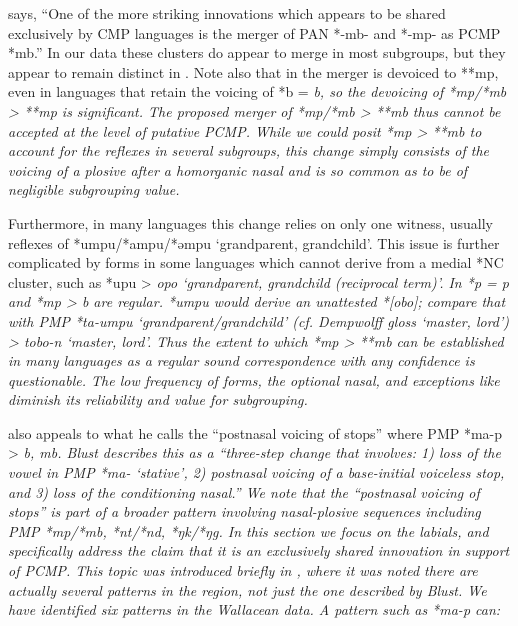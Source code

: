 \citet[26]{Blust1981} says,
“One of the more striking innovations which appears to be shared
exclusively by CMP languages is the merger of PAN *-mb-
and *-mp- as PCMP *mb.” In our data these clusters do appear
to merge in most subgroups,
but they appear to remain distinct in .
Note also that in  the merger is devoiced to
**mp, even in languages that retain the voicing of *b = \it{b},
so the devoicing of *mp/*mb > **mp is significant.
The proposed merger of *mp/*mb > **mb thus cannot be accepted
at the level of putative PCMP.
While we could posit *mp > **mb to account for the reflexes in
several subgroups, this change simply consists of the voicing of a plosive after
a homorganic nasal and is so common as to be of negligible subgrouping value.

Furthermore, in many languages this change relies on only one
witness, usually reflexes of *umpu/*ampu/*əmpu ‘grandparent, grandchild’.
This issue is further complicated by forms in some languages
which cannot derive from a medial *NC cluster,
such as *upu >  \it{opo} ‘grandparent, grandchild (reciprocal term)’.
In  *p = \it{p}
and *mp > \it{b} are regular.
*umpu would derive an unattested *[obo]; compare that with PMP *ta-umpu ‘grandparent/grandchild’ (cf.
Dempwolff gloss ‘master, lord’) >  \it{tobo-n} ‘master, lord’.
Thus the extent to which *mp > **mb can be established in many
languages as a regular sound correspondence with any confidence is questionable.
The low frequency of forms,
the optional nasal, and exceptions like  diminish its reliability
and value for subgrouping.

\citet[72]{Blust2009} also appeals to what he calls the “postnasal
voicing of stops” where PMP *ma-p > \it{b, mb}.
Blust describes this as a “three-step change that involves: 1)
loss of the vowel in PMP *ma- ‘stative’,
2) postnasal voicing of a base-initial voiceless stop,
and 3) loss of the conditioning nasal.” We note that the “postnasal
voicing of stops” is part of a broader pattern involving nasal-plosive
sequences including PMP *mp/*mb, *nt/*nd, *ŋk/*ŋg.
In this section we focus on the labials,
and specifically address the claim that it is an exclusively
shared innovation in support of PCMP.
This topic was introduced briefly in ,
where it was noted there are actually several patterns in the
region, not just the one described by Blust.
We have identified six patterns in the Wallacean data.
A pattern such as *ma-p can:

